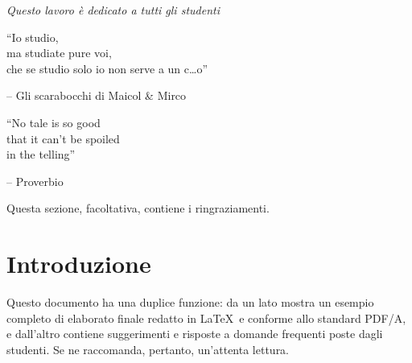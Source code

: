 \documentclass[12pt,italian]{report}
\begin{document}
\frontespizio
\beforepreface

% 
%

{\raggedleft \large \sl Questo lavoro \`{e} dedicato a tutti gli studenti\\
	
	\vspace{2cm}
	
	``Io studio,\\ma studiate pure voi,\\che se studio solo io non serve a un c\dots o''
	
	\bigskip
	
	\--- Gli scarabocchi di Maicol \& Mirco\\
  
	\vspace{2cm}
	
	``No tale is so good \\ that it can't be spoiled \\ in the telling''
	
	\bigskip
	
	\--- Proverbio\\}
         
% 
%


%
%

Questa sezione, facoltativa, contiene i ringraziamenti.

%
%

\afterpreface

% 
% 

\chapter{Introduzione}
\label{cap:introduzione}

Questo documento ha una duplice funzione: da un lato mostra un esempio completo di elaborato finale redatto in \LaTeX\ e conforme allo standard PDF/A, e dall'altro contiene suggerimenti e risposte a domande frequenti poste dagli studenti. Se ne raccomanda, pertanto, un'attenta lettura.
\end{document}

